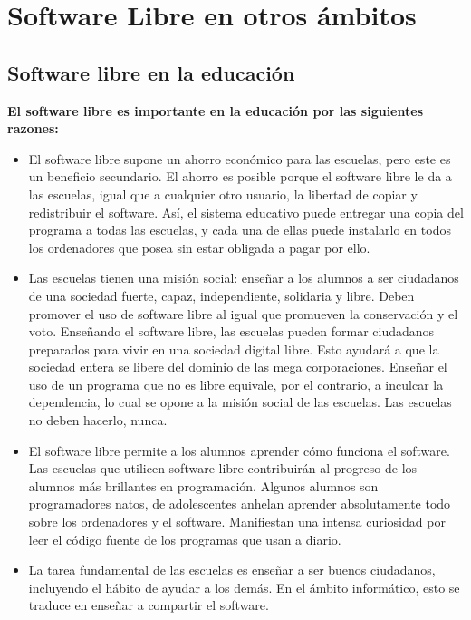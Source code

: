 \chapter{Software Libre en otros ámbitos}

\section{Software libre en la educación}

{\bf El software libre es importante en la educación por las siguientes razones:}
\begin{itemize}
\item El software libre supone un ahorro económico para las escuelas, pero este es un beneficio secundario. El ahorro es posible porque el software libre le da a las escuelas, igual que a cualquier otro usuario, la libertad de copiar y redistribuir el software. Así, el sistema educativo puede entregar una copia del programa a todas las escuelas, y cada una de ellas puede instalarlo en todos los ordenadores que posea sin estar obligada a pagar por ello.
\item Las escuelas tienen una misión social: enseñar a los alumnos a ser ciudadanos de una sociedad fuerte, capaz, independiente, solidaria y libre. Deben promover el uso de software libre al igual que promueven la conservación y el voto. Enseñando el software libre, las escuelas pueden formar ciudadanos preparados para vivir en una sociedad digital libre. Esto ayudará a que la sociedad entera se libere del dominio de las mega corporaciones. Enseñar el uso de un programa que no es libre equivale, por el contrario, a inculcar la dependencia, lo cual se opone a la misión social de las escuelas. Las escuelas no deben hacerlo, nunca.
\item El software libre permite a los alumnos aprender cómo funciona el software. Las escuelas que utilicen software libre contribuirán al progreso de los alumnos más brillantes en programación. Algunos alumnos son programadores natos, de adolescentes anhelan aprender absolutamente todo sobre los ordenadores y el software. Manifiestan una intensa curiosidad por leer el código fuente de los programas que usan a diario.
\item La tarea fundamental de las escuelas es enseñar a ser buenos ciudadanos, incluyendo el hábito de ayudar a los demás. En el ámbito informático, esto se traduce en enseñar a compartir el software.
\end{itemize}


